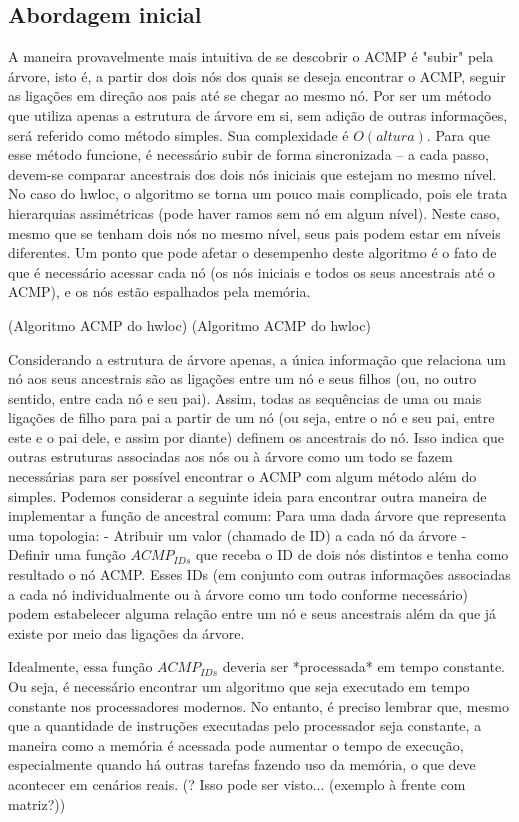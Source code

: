 \subsection{Abordagem inicial}

A maneira provavelmente mais intuitiva de se descobrir o ACMP é "subir" pela árvore, isto é, a partir dos dois nós dos quais se deseja encontrar o ACMP,
seguir as ligações em direção aos pais até se chegar ao mesmo nó.
Por ser um método que utiliza apenas a estrutura de árvore em si, sem adição de outras informações, será referido como método simples.
Sua complexidade é $O(altura)$.
Para que esse método funcione, é necessário subir de forma sincronizada -- a cada passo, devem-se comparar ancestrais dos dois nós iniciais que estejam no mesmo nível.
No caso do hwloc, o algoritmo se torna um pouco mais complicado, pois ele trata hierarquias assimétricas (pode haver ramos sem nó em algum nível).
Neste caso, mesmo que se tenham dois nós no mesmo nível, seus pais podem estar em níveis diferentes.
Um ponto que pode afetar o desempenho deste algoritmo é o fato de que é necessário acessar cada nó
(os nós iniciais e todos os seus ancestrais até o ACMP), e os nós estão espalhados pela memória.

(Algoritmo ACMP do hwloc)
(Algoritmo ACMP do hwloc)

Considerando a estrutura de árvore apenas, a única informação que relaciona um nó aos seus ancestrais
são as ligações entre um nó e seus filhos (ou, no outro sentido, entre cada nó e seu pai).
Assim, todas as sequências de uma ou mais ligações de filho para pai a partir de um nó (ou seja,
entre o nó e seu pai, entre este e o pai dele, e assim por diante) definem os ancestrais do nó.
Isso indica que outras estruturas associadas aos nós ou à árvore como um todo se fazem necessárias
para ser possível encontrar o ACMP com algum método além do simples.
Podemos considerar a seguinte ideia para encontrar outra maneira de implementar a função de ancestral comum:
Para uma dada árvore que representa uma topologia:
- Atribuir um valor (chamado de ID) a cada nó da árvore
- Definir uma função $ACMP_{IDs}$ que receba o ID de dois nós distintos e tenha como resultado o nó ACMP.
Esses IDs (em conjunto com outras informações associadas a cada nó individualmente ou à árvore como um todo conforme necessário)
podem estabelecer alguma relação entre um nó e seus ancestrais além da que já existe por meio das ligações da árvore.

Idealmente, essa função $ACMP_{IDs}$ deveria ser *processada* em tempo constante.
Ou seja, é necessário encontrar um algoritmo que seja executado em tempo constante nos processadores modernos.
No entanto, é preciso lembrar que, mesmo que a quantidade de instruções executadas pelo processador seja constante,
a maneira como a memória é acessada pode aumentar o tempo de execução, especialmente quando há outras tarefas fazendo uso da memória, o que deve acontecer em cenários reais.
(? Isso pode ser visto... (exemplo à frente com matriz?))

